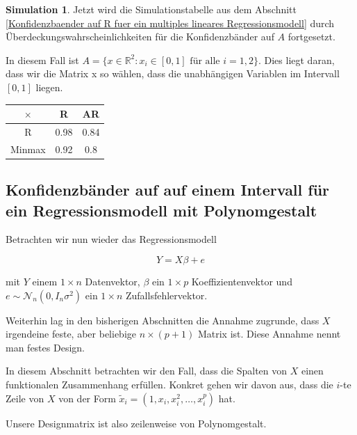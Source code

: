 \documentclass[12pt,a4paper]{article}
\theoremstyle{definition}
\theoremstyle{definition}
\theoremstyle{definition}
\newtheorem{Simulation}[Definition]{Simulation}
\newcommand{\UeberRR}{0.98}
\newcommand{\UeberRMinmax}{0.92}
\newcommand{\UeberARR}{0.84}
\newcommand{\UeberARMinmax}{0.8}
\begin{document}
\begin{Simulation}
Jetzt wird die Simulationstabelle aus dem Abschnitt \ref{Konfidenzbaender auf R fuer ein multiples lineares Regressionsmodell} durch Überdeckungswahrscheinlichkeiten für die Konfidenzbänder auf $A$ fortgesetzt. 

In diesem Fall ist $A = \{x \in \mathbb{R}^2 : x_i \in [0,1] \text{ für alle } i=1, 2 \}$. Dies liegt daran, dass wir die Matrix x so wählen, dass die unabhängigen Variablen im Intervall $[0,1]$ liegen.

\begin{center}
\begin{tabular}{|c|c|c|}
\hline 
$\times$ & R & AR \\ 
\hline 
R 		& \UeberRR & \UeberARR \\ 
\hline 
Minmax 	& \UeberRMinmax & \UeberARMinmax \\ 
\hline 
\end{tabular}
\end{center}

\end{Simulation}



\subsection{Konfidenzbänder auf auf einem Intervall für ein Regressionsmodell mit Polynomgestalt}
\label{Konfidenzbaenderauf auf einem Intervall für Regressionsmodell mit Polynomgestalt}
Betrachten wir nun wieder das Regressionsmodell 

\begin{equation*}
Y=X\beta+e
\end{equation*}

mit $Y$ einem $1 \times n$ Datenvektor, $\beta$ ein $1 \times p$ Koeffizientenvektor und $e \sim \mathscr{N}_n (0,I_n \sigma^2)$ ein $1 \times n$ Zufallsfehlervektor.

Weiterhin lag in den bisherigen Abschnitten die Annahme zugrunde, dass $X$ irgendeine feste, aber beliebige $n \times (p+1)$ Matrix ist. Diese Annahme nennt man festes Design.

In diesem Abschnitt betrachten wir den Fall, dass die Spalten von $X$ einen funktionalen Zusammenhang erfüllen. Konkret gehen wir davon aus, dass die $i$-te Zeile von $X$ von der Form $\tilde{x}_i = (1,x_i,x_{i}^{2},\ldots,x_{i}^{p})$ hat. 

Unsere Designmatrix ist also zeilenweise von Polynomgestalt. 
\end{document}
